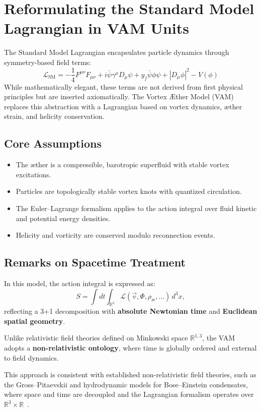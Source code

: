\section{Reformulating the Standard Model Lagrangian in VAM Units}\label{sec:lagrangian_vam}
The Standard Model Lagrangian encapsulates particle dynamics through symmetry-based field terms:
\begin{equation}
    \mathcal{L}_{\text{SM}} = -\frac{1}{4}F^{\mu\nu}F_{\mu\nu} + i\bar{\psi}\gamma^\mu D_\mu \psi + y_f \bar{\psi}\phi \psi + |D_\mu \phi|^2 - V(\phi)
\end{equation}
While mathematically elegant, these terms are not derived from first physical principles but are inserted axiomatically. The Vortex Æther Model (VAM) replaces this abstraction with a Lagrangian based on vortex dynamics, æther strain, and helicity conservation.

\subsection*{Core Assumptions}
\begin{itemize}
    \item The æther is a compressible, barotropic superfluid with stable vortex excitations.
    \item Particles are topologically stable vortex knots with quantized circulation.
    \item The Euler–Lagrange formalism applies to the action integral over fluid kinetic and potential energy densities.
    \item Helicity and vorticity are conserved modulo reconnection events.
\end{itemize}

\subsection*{Remarks on Spacetime Treatment}

In this model, the action integral is expressed as:
\[
    S = \int dt \int_{\mathbb{R}^3} \mathcal{L}(\vec{v}, \Phi, \rho_\text{\ae}, \dots) \, d^3x,
\]
reflecting a 3+1 decomposition with \textbf{absolute Newtonian time} and \textbf{Euclidean spatial geometry}.

Unlike relativistic field theories defined on Minkowski space \( \mathbb{R}^{1,3} \), the VAM adopts a \textbf{non-relativistic ontology}, where time is globally ordered and external to field dynamics.

This approach is consistent with established non-relativistic field theories, such as the Gross–Pitaevskii and hydrodynamic models for Bose–Einstein condensates, where space and time are decoupled and the Lagrangian formalism operates over \( \mathbb{R}^3 \times \mathbb{R} \)~\cite{Pethick2008BEC}.

